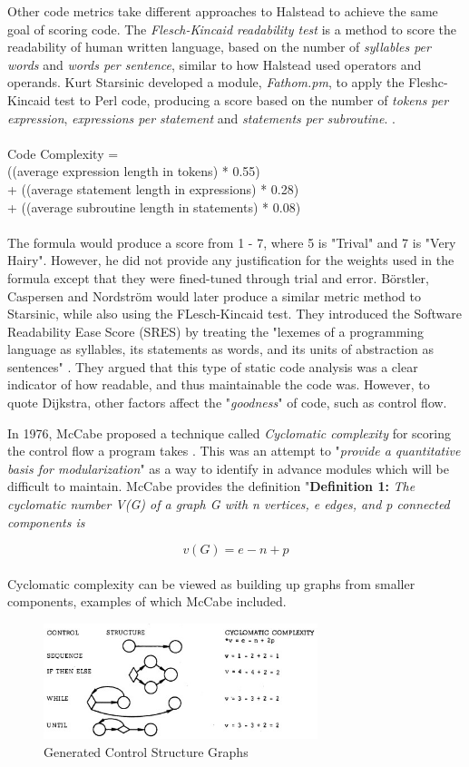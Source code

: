 \documentclass[manuscript,screen,review,sigconf]{acmart}
\begin{document}
Other code metrics take different approaches to Halstead to achieve the same goal of scoring code. The \textit{Flesch-Kincaid readability test} \cite{FleschReading} is a method to score the readability of human written language, based on the number of \textit{syllables per words} and \textit{words per sentence}, similar to how Halstead used operators and operands. Kurt Starsinic developed a module, \textit{Fathom.pm}, to apply the Fleshc-Kincaid test to Perl code, producing a score based on the number of \textit{{}tokens per expression}, \textit{expressions per statement} and \textit{statements per subroutine}. \cite{Starsinic_1998}.
\\ \\
Code Complexity =\\
  ((average expression length in tokens) * 0.55)\\
+ ((average statement length in expressions) * 0.28)\\
+ ((average subroutine length in statements) * 0.08)\\
\\
The formula would produce a score from 1 - 7, where 5 is "Trival" and 7 is "Very Hairy".  However, he did not provide any justification for the weights used in the formula except that they were fined-tuned through trial and error.
Börstler, Caspersen and Nordström would later produce a similar metric method to Starsinic, while also using the FLesch-Kincaid test. They introduced the Software Readability Ease Score (SRES) by treating the "lexemes of a programming language as syllables, its statements as words, and its units of abstraction as sentences" \cite{borstler2007beauty}. They argued that this type of static code analysis was a clear indicator of how readable, and thus maintainable the code was. However, to quote Dijkstra, other factors affect the "\textit{goodness}" of code, such as control flow.

In 1976, McCabe proposed a technique called \textit{Cyclomatic complexity} for scoring the control flow a program takes \cite{A_Complexity_Measure}. This was an attempt to "\textit{provide a quantitative basis for modularization}" as a way to identify in advance modules which will be difficult to maintain. McCabe provides the definition
"\textbf{Definition 1:} \textit{The cyclomatic number V(G) of a graph G
with n vertices, e edges, and p connected components is}

\[v(G)=e- n+p\]
\\
Cyclomatic complexity can be viewed as building up graphs from smaller components, examples of which McCabe included.
\begin{figure}[h]
    \includegraphics[width=8cm]{controlFlowDia.jpg}
    \caption{Generated Control Structure Graphs \cite{A_Complexity_Measure}}
    \label{fig:CC Graphs}
    \centering
\end{figure}
\end{document}

